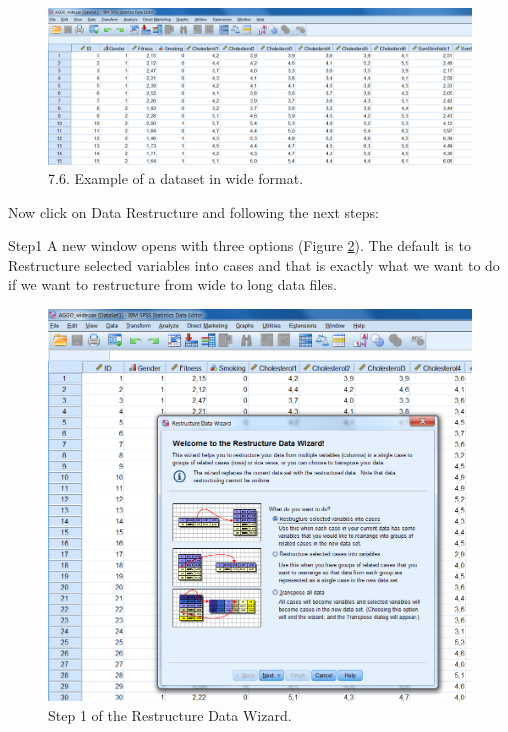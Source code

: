\documentclass[]{book}
\begin{document}
\begin{figure}

{\centering \includegraphics[width=0.9\linewidth]{images/fig7.6} 

}

\caption{7.6. Example of a dataset in wide format.}\label{fig:fig76}
\end{figure}

Now click on Data Restructure and following the next steps:

Step1 A new window opens with three options (Figure \ref{fig:fig77}).
The default is to Restructure selected variables into cases and that is
exactly what we want to do if we want to restructure from wide to long
data files.

\begin{figure}

{\centering \includegraphics[width=0.9\linewidth]{images/fig7.7} 

}

\caption{Step 1 of the Restructure Data Wizard.}\label{fig:fig77}
\end{figure}
\end{document}
